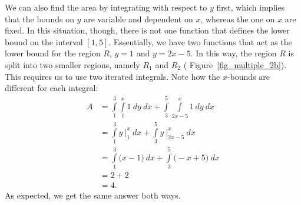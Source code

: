 \begin{example}
We can also find the area by integrating with respect to $y$ first, which implies that the bounds on $y$ are variable and dependent on $x$, whereas the one on $x$ are fixed. In this situation, though, there is not one function that defines the lower bound on the interval $[1,5]$. Essentially, we have two functions that act as the lower bound for the region $R$, $y=1$ and $y=2x-5$. In this way, the region $R$ is split into two smaller regions, namely $R_1$ and $R_2$ ( Figure~\ref{fig_multiple_2b}). This requires us to use two iterated integrals. Note how the $x$-bounds are different for each integral:
\begin{align*}
A &= \int\limits_1^3\int\limits_1^x 1\ dy \ dx +  \int\limits_3^5\int\limits_{2x-5}^x1\ dy\ dx\\
	&= \int\limits_1^3 y\ \Big|_1^x\ dx  + \int\limits_3^5 y \  \Big|_{2x-5}^x\ dx\\
	&= \int\limits_1^3\big(x-1\big)\ dx  +  \int\limits_3^5\big(-x+5\big)\ dx \\
	&= 2  +  2 \\
	&=4.
\end{align*}
As expected, we get the same answer both ways.
\end{example}

